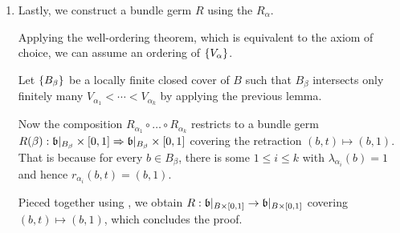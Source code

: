\begin{scope}
\begin{myproof}
\begin{enumerate}
            \item Lastly, we construct a bundle germ $R$ using the $R_\alpha$.

            Applying the well-ordering theorem, which is equivalent to the axiom of choice, we can assume an ordering of $\{V_\alpha\}$.

            Let $\{B_\beta\}$ be a locally finite closed cover of $B$
            such that $B_\beta$ intersects only finitely many $V_{\alpha_1} < \cdots < V_{\alpha_k}$
            by applying the previous lemma.

            Now the composition $R_{\alpha_1} \circ \ldots \circ R_{\alpha_k}$ restricts to a bundle germ $R(\beta): \mathfrak{b}\vert_{B_\beta} \times{} [0, 1] \Rightarrow{} \mathfrak{b}\vert_{B_\beta} \times{} [0, 1]$ covering the retraction $(b, t) \mapsto (b, 1)$.
            That is because for every $b \in B_\beta$, there is some $1 \le i \le k$ with $\lambda_{\alpha_i}(b) = 1$ and hence $r_{\alpha_i}(b, t) = (b, 1)$.
            
            Pieced together using , we obtain $R: \mathfrak{b}\vert_{B \times{} [0, 1]} \to \mathfrak{b}\vert_{B \times{} [0, 1]}$ covering $(b, t) \mapsto (b, 1)$, which concludes the proof.
        \end{enumerate}    
    \end{myproof}
\end{scope}